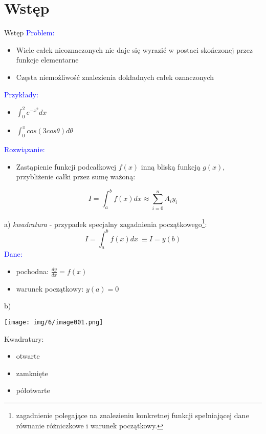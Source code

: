 \section{Wstęp}
	\begin{frame}{Wstęp} 
		\textcolor{blue}{Problem:}

		\begin{itemize}
			\item Wiele całek nieoznaczonych nie daje się wyrazić w postaci skończonej przez funkcje elementarne
			\item Częsta niemożliwość znalezienia dokładnych całek oznaczonych
    	\end{itemize}

		\textcolor{blue}{Przykłady:}
		\begin{itemize}
			\item $\int_{0}^{2}e^{-x^{2}} dx$
			\item $\int_{0}^{\pi}cos(3cos\theta) d\theta$
    	\end{itemize}
    	
    	\textcolor{blue}{Rozwiązanie:}
    	\begin{itemize}
    	\item Zastąpienie funkcji podcałkowej $f(x)$ inną bliską funkcją $g(x)$, przybliżenie całki przez sumę ważoną:
    	\end{itemize}
    	$$I=\int_{a}^{b}f(x)dx \approx\sum_{i=0}^{n}A_{i}y_{i}$$
   	 	
	\end{frame}
	\begin{frame}
    
a) \textit {kwadratura} - przypadek specjalny zagadnienia początkowego\footnote{zagadnienie polegające na znalezieniu konkretnej funkcji spełniającej dane równanie różniczkowe i warunek początkowy.}:
$$
 I=\int_{a}^{b}f(x)dx\ \equiv I=y(b)
$$
\textcolor{blue}{Dane:} 
\begin{itemize}
	\item pochodna: $\displaystyle \frac{dy}{dx}=f(x)$
	\item warunek początkowy: $y(a)=0$
  \end{itemize}
\end{frame}
    \begin{frame}
    
      b)
      \begin{center}
      	\texttt{[image: img/6/image001.png]}
      \end{center}
      
      \begin{block}{}
      Kwadratury:
      
        \begin{itemize}
          \item otwarte 
          \item zamknięte
          \item półotwarte
        \end{itemize}
      \end{block}
    \end{frame}
